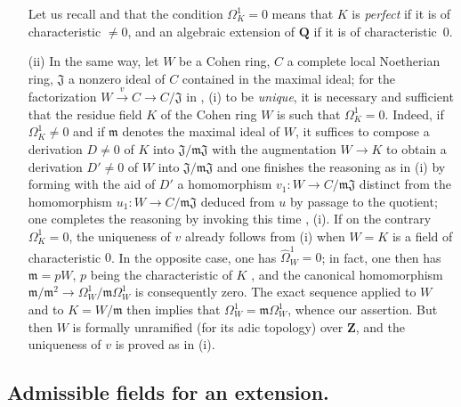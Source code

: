 \begin{remarks}[21.5.3]
\begin{enumerate}
    Let us recall  and  that the condition $\Omega^1_K=0$ means that $K$ is \emph{perfect} if it is of characteristic $\neq 0$, and an algebraic extension of $\mathbf{Q}$ if it is of characteristic~$0$.
  \item[(ii)] In the same way, let $W$ be a Cohen ring, $C$ a complete local Noetherian ring, $\mathfrak{J}$ a nonzero ideal of $C$ contained in the maximal ideal; for the factorization $W\xrightarrow{v} C\to C/\mathfrak{J}$ in , (i) to be \emph{unique}, it is necessary and sufficient that the residue field $K$ of the Cohen ring $W$ is such that $\Omega^1_K=0$.
    Indeed, if $\Omega^1_K\neq 0$ and if $\mathfrak{m}$ denotes the maximal ideal of $W$, it suffices to compose a derivation $D\neq 0$ of $K$ into $\mathfrak{J}/\mathfrak{m}\mathfrak{J}$ with the augmentation $W\to K$ to obtain a derivation $D'\neq 0$ of $W$ into $\mathfrak{J}/\mathfrak{m}\mathfrak{J}$ and one finishes the reasoning as in (i) by forming with the aid of $D'$ a homomorphism $v_1:W\to C/\mathfrak{m}\mathfrak{J}$ distinct from the homomorphism $u_1:W\to C/\mathfrak{m}\mathfrak{J}$ deduced from $u$ by passage to the quotient; one completes the reasoning by invoking this time , (i).
    If on the contrary $\Omega^1_K=0$, the uniqueness of $v$ already follows from (i) when $W=K$ is a field of characteristic $0$.
    In the opposite case, one has $\widehat{\Omega}^1_W=0$; in fact, one then has $\mathfrak{m}=pW$, $p$ being the characteristic of $K$ , and the canonical homomorphism $\mathfrak{m}/\mathfrak{m}^2\to\Omega^1_W/\mathfrak{m}\Omega^1_W$  is consequently zero. The exact sequence  applied to $W$ and to $K=W/\mathfrak{m}$ then implies that $\Omega^1_W=\mathfrak{m}\Omega^1_W$, whence our assertion.
    But then  $W$ is formally unramified (for its adic topology) over $\mathbf{Z}$, and the uniqueness of $v$ is proved as in (i).
\end{enumerate}
\end{remarks}

\subsection{Admissible fields for an extension.}
\label{subsection:0.21.6}

